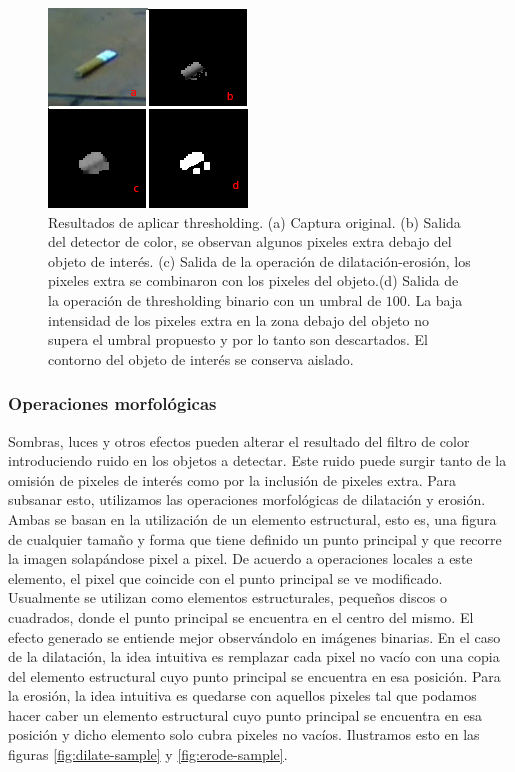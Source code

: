 \begin{figure}[tpb]
\begin{center}
  \includegraphics[scale=0.8]{figuras/threshold.png}
\end{center}
  \caption{\small Resultados de aplicar thresholding. (a) Captura original. (b) Salida del detector de color, se observan algunos pixeles extra debajo del objeto de interés. (c) Salida de la operación de dilatación-erosión, los pixeles extra se combinaron con los pixeles del objeto.(d) Salida de la operación de thresholding binario con un umbral de $100$. La baja intensidad de los pixeles extra en la zona debajo del objeto no supera el umbral propuesto y por lo tanto son descartados. El contorno del objeto de interés se conserva aislado.} 
  \label{fig:threshold}
\end{figure}

	\subsubsection{\label{sec:morph} Operaciones morfológicas}
Sombras, luces y otros efectos pueden alterar el resultado del filtro de color introduciendo ruido en los objetos a detectar. Este ruido puede surgir tanto de la omisión de pixeles de interés como por la inclusión de pixeles extra. Para subsanar esto, utilizamos las operaciones morfológicas de dilatación y erosión. Ambas se basan en la utilización de un elemento estructural, esto es, una figura de cualquier tamaño y forma que tiene definido un punto principal y que recorre la imagen solapándose pixel a pixel. De acuerdo a operaciones locales a este elemento, el pixel que coincide con el punto principal se ve modificado. Usualmente se utilizan como elementos estructurales, pequeños discos o cuadrados, donde el punto principal se encuentra en el centro del mismo. El efecto generado se entiende mejor observándolo en imágenes binarias. En el caso de la dilatación, la idea intuitiva es remplazar cada pixel no vacío con una copia del elemento estructural cuyo punto principal se encuentra en esa posición. Para la erosión, la idea intuitiva es quedarse con aquellos pixeles tal que podamos hacer caber un elemento estructural cuyo punto principal se encuentra en esa posición y dicho elemento solo cubra pixeles no vacíos.
Ilustramos esto en las figuras \ref{fig:dilate-sample} y \ref{fig:erode-sample}.


